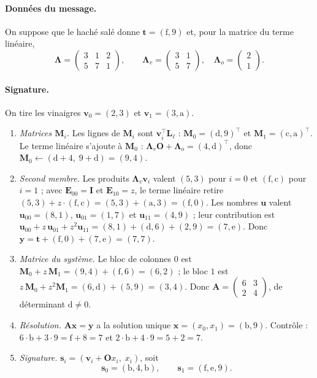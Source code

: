 \paragraph{Données du message.} On suppose que le haché salé donne $\mathbf{t}=(\mathrm{f},9)$ et, pour la matrice du terme linéaire,
\[\boldsymbol{\Lambda}=\begin{pmatrix}3&1&2\\5&7&1\end{pmatrix},\qquad\boldsymbol{\Lambda}_v=\begin{pmatrix}3&1\\5&7\end{pmatrix},\quad\boldsymbol{\Lambda}_o=\begin{pmatrix}2\\1\end{pmatrix}.\]

\paragraph{Signature.} On tire les vinaigres $\mathbf{v}_0=(2,3)$ et $\mathbf{v}_1=(3,\mathrm{a})$.
\begin{enumerate}[itemsep=1pt]
\item \emph{Matrices $\mathbf{M}_i$.} Les lignes de $\mathbf{M}_i$ sont $\mathbf{v}_i^{\top}\mathbf{L}_\ell$ : $\mathbf{M}_0=(\mathrm{d},9)^{\top}$ et $\mathbf{M}_1=(\mathrm{c},\mathrm{a})^{\top}$. Le terme linéaire s'ajoute à $\mathbf{M}_0$ : $\boldsymbol{\Lambda}_v\mathbf{O}+\boldsymbol{\Lambda}_o=(4,\mathrm{d})^{\top}$, donc $\mathbf{M}_0\leftarrow(\mathrm{d}+4,\;9+\mathrm{d})=(9,4)$.
\item \emph{Second membre.} Les produits $\boldsymbol{\Lambda}_v\mathbf{v}_i$ valent $(5,3)$ pour $i=0$ et $(\mathrm{f},\mathrm{c})$ pour $i=1$ ; avec $\mathbf{E}_{00}=\mathbf{I}$ et $\mathbf{E}_{10}=z$, le terme linéaire retire $(5,3)+z\cdot(\mathrm{f},\mathrm{c})=(5,3)+(\mathrm{a},3)=(\mathrm{f},0)$. Les nombres $\mathbf{u}$ valent $\mathbf{u}_{00}=(8,1)$, $\mathbf{u}_{01}=(1,7)$ et $\mathbf{u}_{11}=(4,9)$ ; leur contribution est $\mathbf{u}_{00}+z\,\mathbf{u}_{01}+z^2\mathbf{u}_{11}=(8,1)+(\mathrm{d},6)+(2,9)=(7,\mathrm{e})$. Donc $\mathbf{y}=\mathbf{t}+(\mathrm{f},0)+(7,\mathrm{e})=(7,7)$.
\item \emph{Matrice du système.} Le bloc de colonnes $0$ est $\mathbf{M}_0+z\,\mathbf{M}_1=(9,4)+(\mathrm{f},6)=(6,2)$ ; le bloc $1$ est $z\,\mathbf{M}_0+z^2\mathbf{M}_1=(6,\mathrm{d})+(5,9)=(3,4)$. Donc $\mathbf{A}=\begin{pmatrix}6&3\\2&4\end{pmatrix}$, de déterminant $\mathrm{d}\neq0$.
\item \emph{Résolution.} $\mathbf{A}\mathbf{x}=\mathbf{y}$ a la solution unique $\mathbf{x}=(x_0,x_1)=(\mathrm{b},9)$. Contrôle : $6\cdot\mathrm{b}+3\cdot9=\mathrm{f}+8=7$ et $2\cdot\mathrm{b}+4\cdot9=5+2=7$.
\item \emph{Signature.} $\mathbf{s}_i=(\mathbf{v}_i+\mathbf{O}x_i,\;x_i)$, soit
\[\mathbf{s}_0=(\mathrm{b},4,\mathrm{b}),\qquad\mathbf{s}_1=(\mathrm{f},\mathrm{e},9).\]
\end{enumerate}

